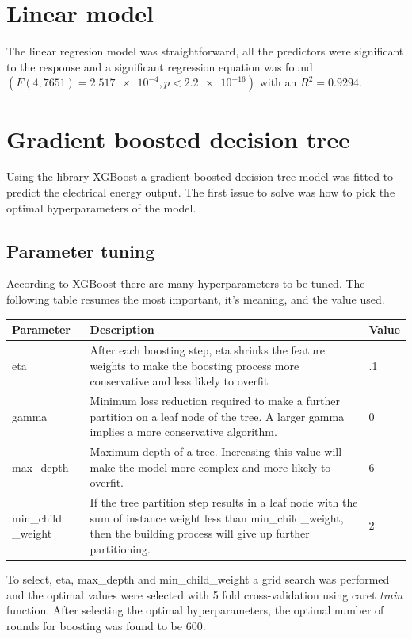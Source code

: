 \section{Linear model}
The linear regresion model was straightforward, all the predictors were significant to the response and a significant regression equation was found $(F(4,7651) = \num{2.517e-4}, p < \num{2.2e-16})$ with an $R^2 = 0.9294$.

\section{Gradient boosted decision tree}

Using the library XGBoost a gradient boosted decision tree model was fitted to predict the electrical energy output. The first issue to solve was how to pick the optimal hyperparameters of the model.

\subsection{Parameter tuning}

According to XGBoost there are many hyperparameters to be tuned. The following table resumes the most important, it's meaning, and the value used.

\begin{tabular}{ |p{2cm}||p{11cm}| p{1cm}|}
\hline
Parameter & Description & Value\\
\hline
eta & After each boosting step, eta shrinks the feature weights to make the boosting process more conservative and less likely to overfit & .1 \\
gamma & Minimum loss reduction required to make a further partition on a leaf node of the tree. A larger gamma implies a more conservative algorithm. & 0 \\
max\_depth & Maximum depth of a tree. Increasing this value will make the model more complex and more likely to overfit. & 6 \\
min\_child \_weight & If the tree partition step results in a leaf node with the sum of instance weight less than min\_child\_weight, then the building process will give up further partitioning. & 2\\
\hline
\end{tabular}

To select, eta, max\_depth and min\_child\_weight a grid search was performed and the optimal values were selected with 5 fold cross-validation using caret \textit{train} function. After selecting the optimal hyperparameters, the optimal number of rounds for boosting was found to be 600.

